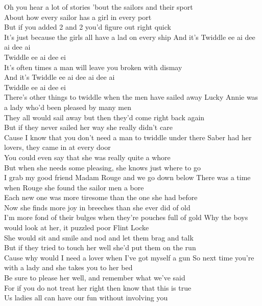 
Oh you hear a lot of stories 'bout the sailors and their sport\\
About how every sailor has a girl in every port\\
But if you added 2 and 2 you'd figure out right quick\\
It's just because the girls all have a lad on every ship
\hops
{} And it's Twiddle ee ai dee ai dee ai\\
 Twiddle ee ai dee ei\\
 It's often times a man will leave you broken with dismay\\
 And it's Twiddle ee ai dee ai dee ai\\
 Twiddle ee ai dee ei\\
 There's other things to twiddle when the men have sailed away
\hops
Lucky Annie was a lady who'd been pleased by many men\\
They all would sail away but then they'd come right back again\\
But if they never sailed her way she really didn't care\\
Cause I know that you don't need a man to twiddle under there
\hops
Saber had her lovers, they came in at every door\\
You could even say that she was really quite a whore\\
But when she needs some pleasing, she knows just where to go\\
I grab my good friend Madam Rouge and we go down below
\hops
There was a time when Rouge she found the sailor men a bore\\
Each new one was more tiresome than the one she had before\\
Now she finds more joy in breeches than she ever did of old\\
I'm more fond of their bulges when they're pouches full of gold
\hops
Why the boys would look at her, it puzzled poor Flint Locke\\
She would sit and smile and nod and let them brag and talk\\
But if they tried to touch her well she'd put them on the run\\
Cause why would I need a lover when I've got myself a gun
\hops
So next time you're with a lady and she takes you to her bed\\
Be sure to please her well, and remember what we've said\\
For if you do not treat her right then know that this is true\\
Us ladies all can have our fun without involving you
